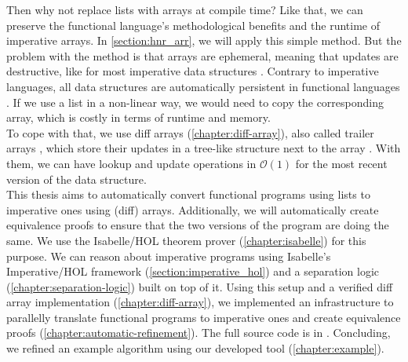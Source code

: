 \noindent Then why not replace lists with arrays at compile time? Like that, we can preserve the functional language's methodological benefits and the runtime of imperative arrays. In \autoref{section:hnr_arr}, we will apply this simple method. But the problem with the method is that arrays are ephemeral, meaning that updates are destructive, like for most imperative data structures \parencite[p.2]{Okasaki_1998}. Contrary to imperative languages, all data structures are automatically persistent in functional languages \parencite[p.2]{Okasaki_1998}.
If we use a list in a non-linear way, we would need to copy the corresponding array, which is costly in terms of runtime and memory. \\
To cope with that, we use diff arrays (\autoref{chapter:diff-array}), also called trailer arrays \parencite{Bloss1989}, which store their updates in a tree-like structure next to the array \parencite[p.706]{Kumar2017}. 
With them, we can have lookup and update operations in $\mathcal{O}(1)$ for the most recent version of the data structure. \\
This thesis aims to automatically convert functional programs using lists to imperative ones using (diff) arrays. Additionally, we will automatically create equivalence proofs to ensure that the two versions of the program are doing the same. We use the Isabelle/HOL theorem prover (\autoref{chapter:isabelle}) for this purpose. We can reason about imperative programs using Isabelle's Imperative/HOL framework (\autoref{section:imperative_hol}) and a separation logic (\autoref{chapter:separation-logic}) built on top of it. Using this setup and a verified diff array implementation (\autoref{chapter:diff-array}), we implemented an infrastructure to parallelly translate functional programs to imperative ones and create equivalence proofs (\autoref{chapter:automatic-refinement}). The full source code is in \cite{repo}. Concluding, we refined an example algorithm using our developed tool (\autoref{chapter:example}).
